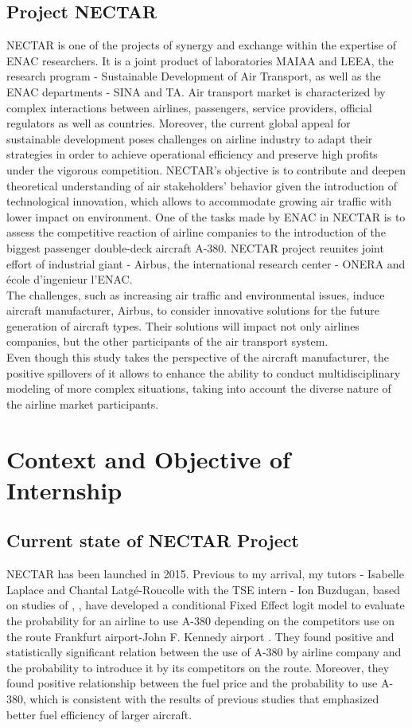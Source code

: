 \documentclass[titlepage, 11pt]{article}
\begin{document}
\subsection{Project NECTAR}\label{NECTAR}
  \tab NECTAR is one of the projects of synergy and exchange within the expertise of ENAC researchers. It is a joint product of laboratories MAIAA and LEEA, the research program - Sustainable Development of Air Transport, as well as the ENAC departments - SINA and TA. Air transport market is characterized by complex interactions between airlines, passengers, service providers, official regulators as well as countries. Moreover, the current global appeal for sustainable development poses challenges on airline industry to adapt their strategies in order to achieve operational efficiency and preserve high profits under the vigorous competition. NECTAR's objective is to contribute and deepen theoretical understanding of air stakeholders' behavior given the introduction of technological innovation, which allows to accommodate growing air traffic with lower impact on environment. One of the tasks made by ENAC in NECTAR is to assess the competitive reaction of airline companies to the introduction of the biggest passenger double-deck aircraft A-380. NECTAR project reunites joint effort of industrial giant - Airbus, the international research center - ONERA and école d'ingenieur l'ENAC.\\  
\tab The challenges, such as increasing air traffic and environmental issues, induce aircraft manufacturer, Airbus, to consider innovative solutions for the future generation of aircraft types. Their solutions will impact not only airlines companies, but the other participants of the air transport system. \\
\tab Even though this study takes the perspective of the aircraft manufacturer, the positive spillovers of it allows to enhance the ability to conduct multidisciplinary modeling of more complex situations, taking into account the diverse nature of the airline market participants. 
\section{Context and Objective of Internship}
\subsection{Current state of NECTAR Project} \label{Current Nectar}
\tab NECTAR has been launched in 2015. Previous to my arrival, my tutors - Isabelle Laplace and Chantal Latgé-Roucolle with the TSE intern - Ion Buzdugan, based on studies of \citeauthor{Givoni1} \cite{Givoni1} \cite{Givoni2}, \citeauthor{Pitfield} \cite{Pitfield}, have developed a conditional Fixed Effect logit model to evaluate the probability for an airline to use A-380 depending on the competitors use on the route Frankfurt airport-John F. Kennedy airport \cite{key}. They found positive and statistically significant relation  between the use of A-380 by airline company and the probability to introduce it by its competitors on the route. Moreover, they found positive relationship between the fuel price and the probability to use A-380, which is consistent with the results of previous studies that emphasized better fuel efficiency of larger aircraft.  
\end{document}
